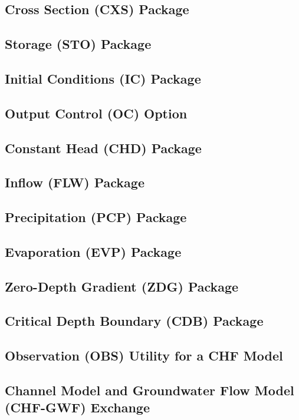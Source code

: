 \newpage
\subsection{Cross Section (CXS) Package}


\newpage
\subsection{Storage (STO) Package}


\newpage
\subsection{Initial Conditions (IC) Package}


\newpage
\subsection{Output Control (OC) Option}


\newpage
\subsection{Constant Head (CHD) Package}


\newpage
\subsection{Inflow (FLW) Package}


\newpage
\subsection{Precipitation (PCP) Package}


\newpage
\subsection{Evaporation (EVP) Package}


\newpage
\subsection{Zero-Depth Gradient (ZDG) Package}


\newpage
\subsection{Critical Depth Boundary (CDB) Package}


\newpage
\subsection{Observation (OBS) Utility for a CHF Model}


\newpage
\subsection{Channel Model and Groundwater Flow Model (CHF-GWF) Exchange}


